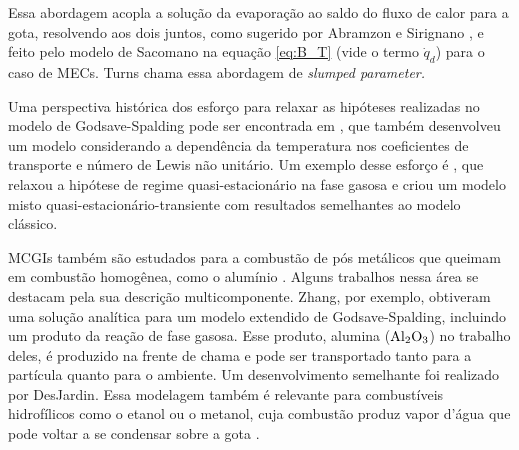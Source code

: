 Essa abordagem acopla a solução da evaporação ao saldo do fluxo de calor para a gota, resolvendo aos dois juntos, como sugerido por Abramzon e Sirignano \cite{Sirignano1989}, e feito pelo modelo de Sacomano\etal \cite{SacomanoF2022IJHMT} na equação \eqref{eq:B_T} (vide o termo $\dot q_d$) para o caso de MECs.
Turns \cite{Turns2000} chama essa abordagem de \emph{slumped parameter.}

Uma perspectiva histórica dos esforço para relaxar as hipóteses realizadas no modelo de Godsave-Spalding pode ser encontrada em \cite{FachiniF1999}, que também desenvolveu um modelo considerando a dependência da temperatura nos coeficientes de transporte e número de Lewis não unitário.
Um exemplo desse esforço é \cite{UlzamaS2007}, que relaxou a hipótese de regime quasi-estacionário na fase gasosa e criou um modelo misto quasi-estacionário-transiente com resultados semelhantes ao modelo clássico.

MCGIs também são estudados para a combustão de pós metálicos que queimam em combustão homogênea, como o alumínio \cite[p. 7]{Bergthorson2015}.
Alguns trabalhos nessa área se destacam pela sua descrição multicomponente. 
Zhang\etal \cite{Zhang2022_Coflow,Zhang2022_Counterflow}, por exemplo, obtiveram uma solução analítica para um modelo extendido de Godsave-Spalding, incluindo um produto da reação de fase gasosa.
Esse produto, alumina ($\mathrm{Al}_2 \mathrm{O}_3$) no trabalho deles, é produzido na frente de chama e pode ser transportado tanto para a partícula quanto para o ambiente.
Um desenvolvimento semelhante foi realizado por DesJardin\etal \cite{DesJardin2005}.
Essa modelagem também é relevante para combustíveis hidrofílicos como o etanol ou o metanol, cuja combustão produz vapor d'água que pode voltar a se condensar sobre a  gota \cite{SacomanoF2024CF,SacomanoF2025CF}.



